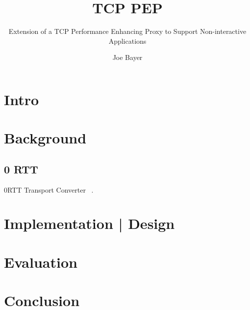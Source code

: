 \documentclass[a4paper,english, 11pt]{report}
\author{Joe Bayer}
\title{TCP PEP}
\subtitle{Extension of a TCP Performance Enhancing Proxy to
Support Non-interactive Applications}
\begin{document}
\uiomasterfp[program={Informatikk: programmering og systemarkitektur}, supervisor={Michael Welzl}]

\section{Intro}
\section{Background}

\subsection{0 RTT}

0RTT Transport Converter ~\cite{rfc8803}.


\section{Implementation | Design}
\section{Evaluation}
\section{Conclusion}

{}

\end{document}

